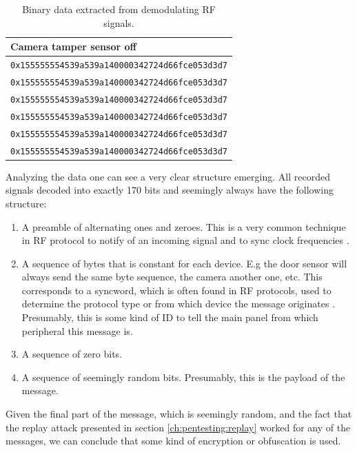 \begin{table}[!ht]
\begin{tabularx}{\textwidth}{l}
        \textbf{Camera tamper sensor off} \\ \hline
        \texttt{0x155555554539a539a140000342724d66fce053d3d7} \\
        \texttt{0x155555554539a539a140000342724d66fce053d3d7} \\
        \texttt{0x155555554539a539a140000342724d66fce053d3d7} \\
        \texttt{0x155555554539a539a140000342724d66fce053d3d7} \\
        \texttt{0x155555554539a539a140000342724d66fce053d3d7} \\
        \texttt{0x155555554539a539a140000342724d66fce053d3d7} \\
        \hline
    \end{tabularx}
    \caption{Binary data extracted from demodulating RF signals.}
    \label{tb:demodulated-data}
\end{table}
Analyzing the data one can see a very clear structure emerging. All recorded signals decoded into exactly 170 bits and seemingly always have the following structure:
\begin{enumerate}
    \item A preamble of alternating ones and zeroes. This is a very common technique in RF protocol to notify of an incoming signal and to sync clock frequencies \cite{hacking-the-iot-talk}.
    \item A sequence of bytes that is constant for each device. E.g the door sensor will always send the same byte sequence, the camera another one, etc. This corresponds to a syncword, which is often found in RF protocols, used to determine the protocol type or from which device the message originates \cite{hacking-the-iot-talk}. Presumably, this is some kind of ID to tell the main panel from which peripheral this message is.
    \item A sequence of zero bits.
    \item A sequence of seemingly random bits. Presumably, this is the payload of the message.
\end{enumerate}
Given the final part of the message, which is seemingly random, and the fact that the replay attack presented in section \ref{ch:pentesting:replay} worked for any of the messages, we can conclude that some kind of encryption or obfuscation is used.

